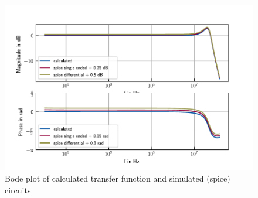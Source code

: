 \documentclass{article}
\begin{document}
\begin{figure}
	\centering
	\includegraphics[width=\linewidth]{Images/pdf/un0rick_aa_filter_bode}
	\caption{Bode plot of calculated transfer function and simulated (spice) circuits}
	\label{fig:un0rick_aa_filter_bode_spice}
\end{figure}
\end{document}
